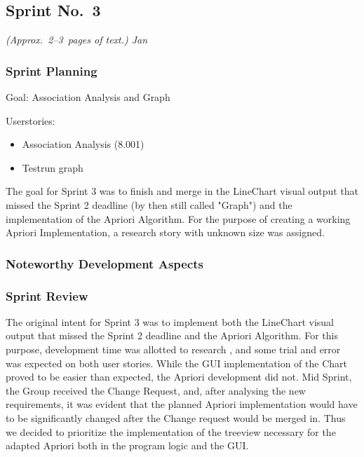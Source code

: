 
\subsection{Sprint No.~3}

\emph{(Approx.~2--3~pages of text.) Jan}

\subsubsection*{Sprint Planning}

Goal: Association Analysis and Graph

Userstories: 

\begin{itemize}
\item Association Analysis (8.001)

\item Testrun graph

\end{itemize}
The goal for Sprint 3 was to finish and merge in the LineChart visual output that missed the Sprint 2 deadline (by then still called "Graph") and the implementation of the Apriori Algorithm. 
For the purpose of creating a working Apriori Implementation, a research story with unknown size was assigned. 

\subsubsection*{Noteworthy Development Aspects}

\subsubsection*{Sprint Review}
The original intent for Sprint 3 was to implement both the LineChart visual output that missed the Sprint 2 deadline and the Apriori Algorithm. For this purpose, development time was allotted to research , and some trial and error was expected on both user stories. 
While the GUI implementation of the Chart proved to be easier than expected, the Apriori development did not. Mid Sprint, the Group received the Change Request, and, after analysing the new requirements, it was evident that the planned Apriori implementation would have to be significantly changed after the Change request would be merged in. 
Thus we decided to prioritize the implementation of the treeview necessary for the adapted Apriori both in the program logic and the GUI. 
